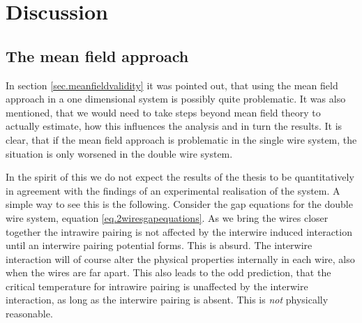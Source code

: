 \chapter{Discussion} %

\label{Chapter12} %

\section{The mean field approach} \label{sec.Discussion.meanfieldapproach}
In section \ref{sec.meanfieldvalidity} it was pointed out, that using the mean field approach in a one dimensional system is possibly quite problematic. It was also mentioned, that we would need to take steps beyond mean field theory to actually estimate, how this influences the analysis and in turn the results. It is clear, that if the mean field approach is problematic in the single wire system, the situation is only worsened in the double wire system. 

In the spirit of this we do not expect the results of the thesis to be quantitatively in agreement with the findings of an experimental realisation of the system. A simple way to see this is the following. Consider the gap equations for the double wire system, equation \eqref{eq.2wiresgapequations}. As we bring the wires closer together the intrawire pairing is not affected by the interwire induced interaction until an interwire pairing potential forms. This is absurd. The interwire interaction will of course alter the physical properties internally in each wire, also when the wires are far apart. This also leads to the odd prediction, that the critical temperature for intrawire pairing is unaffected by the interwire interaction, as long as the interwire pairing is absent. This is \textit{not} physically reasonable. 

